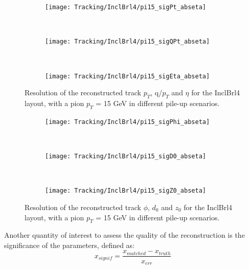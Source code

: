 \documentclass[a4paper,twoside,12pt]{book}
\begin{document}
\begin{figure}
\begin{subfigure}{\linewidth}
\centering
\texttt{[image: Tracking/InclBrl4/pi15\_sigPt\_abseta]}
\caption{}
\label{fig:tracking:pi15_sigPt_abseta_InclBrl4}
\end{subfigure}\\[1ex]
\begin{subfigure}{\linewidth}
\centering
\texttt{[image: Tracking/InclBrl4/pi15\_sigQPt\_abseta]}
\caption{}
\label{fig:tracking:pi15_sigQPt_abseta_InclBrl4}
\end{subfigure}\\[1ex]
\begin{subfigure}{\linewidth}
\centering
\texttt{[image: Tracking/InclBrl4/pi15\_sigEta\_abseta]}
\caption{}
\label{fig:tracking:pi15_sigEta_abseta_InclBrl4}
\end{subfigure}
\caption{Resolution of the reconstructed track $p_{T}$, q/$p_{T}$ and $\eta$ for the InclBrl4 layout, with a pion $p_{T}$ = 15 GeV in different pile-up scenarios.}
\label{fig:tracking:resolutionPileup_InclBrl4-1}
\end{figure}

\begin{figure}
\begin{subfigure}{\linewidth}
\centering
\texttt{[image: Tracking/InclBrl4/pi15\_sigPhi\_abseta]}
\caption{}
\label{fig:tracking:pi15_sigPhi_abseta_InclBrl4}
\end{subfigure}\\[1ex]
\begin{subfigure}{\linewidth}
\centering
\texttt{[image: Tracking/InclBrl4/pi15\_sigD0\_abseta]}
\caption{}
\label{fig:tracking:pi15_sigD0_abseta_InclBrl4}
\end{subfigure}\\[1ex]
\begin{subfigure}{\linewidth}
\centering
\texttt{[image: Tracking/InclBrl4/pi15\_sigZ0\_abseta]}
\caption{}
\label{fig:tracking:pi15_sigZ0_abseta_InclBrl4}
\end{subfigure}
\caption{Resolution of the reconstructed track $\phi$, $d_{0}$ and $z_{0}$ for the InclBrl4 layout, with a pion $p_{T}$ = 15 GeV in different pile-up scenarios.}
\label{fig:tracking:resolutionPileup_InclBrl4-2}
\end{figure}


Another quantity of interest to assess the quality of the reconstruction is the significance of the parameters, defined as:
$$
x_{signif} = \frac{x_{matched} - x_{truth}}{x_{err}}
$$
\end{document}
